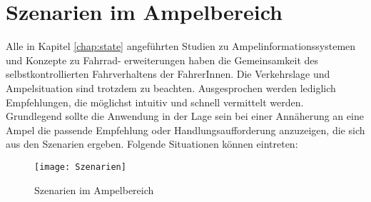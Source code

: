 \chapter{\label{chap:szenarien}Szenarien im Ampelbereich}
Alle in Kapitel \ref{chap:state} angeführten Studien zu Ampelinformationssystemen und Konzepte zu Fahrrad- erweiterungen haben die Gemeinsamkeit des selbstkontrollierten Fahrverhaltens der FahrerInnen. Die Verkehrslage und Ampelsituation sind trotzdem zu beachten. Ausgesprochen werden lediglich Empfehlungen, die möglichst intuitiv und schnell vermittelt werden.\\ 
Grundlegend sollte die Anwendung in der Lage sein bei einer Annäherung an eine Ampel die passende Empfehlung oder Handlungsaufforderung anzuzeigen, die sich aus den Szenarien ergeben. Folgende Situationen können eintreten:\\
\begin{figure}[H]  
    \centering  
    \texttt{[image: Szenarien]} 
    \grayRule
    \caption[Szenarien]{Szenarien im Ampelbereich}
    \label{fig:szenarien}
\end{figure} \vspace{17pt}
